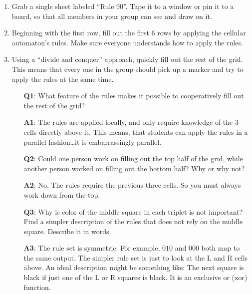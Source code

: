\documentclass{article}
\begin{document}
\begin{enumerate}
	\item Grab a single sheet labeled ``Rule 90''. Tape it to a window or pin
	it to a board, so that all members in your group can see and draw on it.

	\item Beginning with the first row, fill out the first $6$ rows by applying
	the cellular automaton's rules. Make sure everyone understands how to
	apply the rules.

	\item Using a ``divide and conquer'' approach, quickly fill out the rest
	of the grid. This means that every one in the group should pick up a marker
	and try to apply the rules at the same time.

		\begin{itemize}
		\item[\textbf{Q1}:] What feature of the rules makes it possible to cooperatively
		fill out the rest of the grid?

		\item[\textbf{A1}:] The rules are applied locally, and only require knowledge
		of the 3 cells directly above it. This means, that students can apply the
		rules in a parallel fashion\ldots it is embarrassingly parallel.

		\item[\textbf{Q2}:] Could one person work on filling out the top half of the grid,
		while another person worked on filling out the bottom half?
		Why or why not?

		\item[\textbf{A2}:] No. The rules require the previous three cells. So you
		must always work down from the top.

		\item[\textbf{Q3}:] Why is color of the middle square in each triplet
  is not important? Find a simpler description of the rules that does not rely on
  the middle square. Describe it in words.

  \item[\textbf{A3}:] The rule set is symmetric. For example, $010$ and $000$
  both map to the same output. The simpler rule set is just to look at the
  L and R cells above. An ideal description might be something like: The next
  square is black if just one of the L or R squares is black. It is an
  exclusive or (xor) function.

		\end{itemize}

\end{enumerate}
\end{document}
